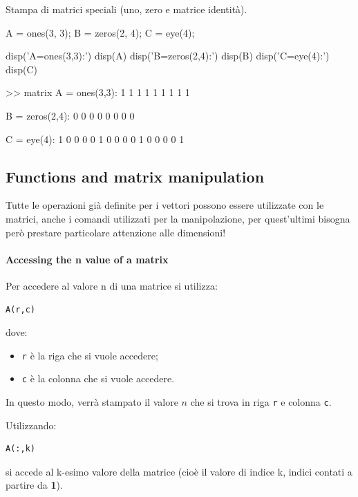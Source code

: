 \begin{example}
    Stampa di matrici speciali (uno, zero e matrice identità).
\end{example}
\begin{matlab}
    A = ones(3, 3);
    B = zeros(2, 4);
    C = eye(4);

    disp('A=ones(3,3):')
    disp(A)
    disp('B=zeros(2,4):')
    disp(B)
    disp('C=eye(4):')
    disp(C)
\end{matlab}
\begin{matlabconsole}
    >> matrix
    A = ones(3,3):
    1     1     1
    1     1     1
    1     1     1

    B = zeros(2,4):
    0     0     0     0
    0     0     0     0

    C = eye(4):
    1     0     0     0
    0     1     0     0
    0     0     1     0
    0     0     0     1
\end{matlabconsole}

\subsection{Functions and matrix manipulation}
Tutte le operazioni già definite per i vettori possono essere utilizzate con le matrici, anche i comandi
utilizzati per la manipolazione, per quest'ultimi bisogna però prestare particolare attenzione alle dimensioni!

\paragraph{Accessing the n value of a matrix}
Per accedere al valore n di una matrice si utilizza:
\begin{verbatim}
A(r,c)
\end{verbatim}
dove:
\begin{itemize}
    \item \verb|r| è la riga che si vuole accedere;
    \item \verb|c| è la colonna che si vuole accedere.
\end{itemize}
In questo modo, verrà stampato il valore $ n $ che si trova in riga \verb|r| e colonna \verb|c|.

Utilizzando:
\begin{verbatim}
A(:,k)
\end{verbatim}
si accede al k-esimo valore della matrice (cioè il valore di indice k, indici contati
a partire da \textbf{1}).

